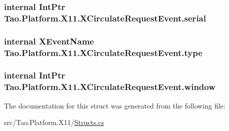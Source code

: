 \label{struct_tao_1_1_platform_1_1_x11_1_1_x_circulate_request_event_a54f2870978b17f7f51fb0df77c9ef3e9}
\hypertarget{struct_tao_1_1_platform_1_1_x11_1_1_x_circulate_request_event_ae55e9b0d2a66d5be70b51e518dc87a8d}{
\subsubsection[{serial}]{\setlength{\rightskip}{0pt plus 5cm}internal IntPtr {\bf Tao.Platform.X11.XCirculateRequestEvent.serial}}}
\label{struct_tao_1_1_platform_1_1_x11_1_1_x_circulate_request_event_ae55e9b0d2a66d5be70b51e518dc87a8d}
\hypertarget{struct_tao_1_1_platform_1_1_x11_1_1_x_circulate_request_event_a8cff8e8af4ea7c7d6912131c8777ac27}{
\subsubsection[{type}]{\setlength{\rightskip}{0pt plus 5cm}internal {\bf XEventName} {\bf Tao.Platform.X11.XCirculateRequestEvent.type}}}
\label{struct_tao_1_1_platform_1_1_x11_1_1_x_circulate_request_event_a8cff8e8af4ea7c7d6912131c8777ac27}
\hypertarget{struct_tao_1_1_platform_1_1_x11_1_1_x_circulate_request_event_ad691743b89bf096d2bcc9b2b6685bf7c}{
\subsubsection[{window}]{\setlength{\rightskip}{0pt plus 5cm}internal IntPtr {\bf Tao.Platform.X11.XCirculateRequestEvent.window}}}
\label{struct_tao_1_1_platform_1_1_x11_1_1_x_circulate_request_event_ad691743b89bf096d2bcc9b2b6685bf7c}


The documentation for this struct was generated from the following file:\begin{DoxyCompactItemize}
\item 
src/Tao.Platform.X11/\hyperlink{_structs_8cs}{Structs.cs}\end{DoxyCompactItemize}
